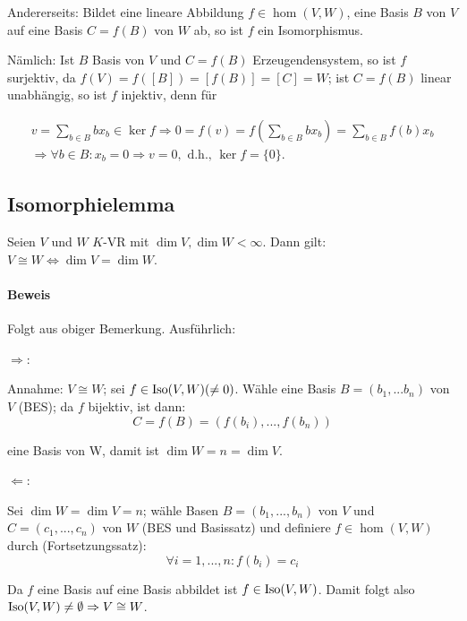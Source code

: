 	Andererseits: Bildet eine lineare Abbildung $f\in \hom(V,W)$, eine Basis $B$ von $V$ auf eine Basis $C = f(B)$ von $W$ ab, so ist $f$ ein Isomorphismus.
	
	Nämlich: Ist $B$ Basis von $V$ und $ C = f(B)$ Erzeugendensystem, so ist $f$ surjektiv, da $f(V) = f ([B]) = [f(B)] = [C] = W$;
	ist $C =f(B)$ linear unabhängig, so ist $f$ injektiv, denn für
			
	\begin{gather*}
		v = \sum_{b\in B} bx_b \in \ker f \Rightarrow 0 = f(v) = f(\sum_{b\in B}bx_b) = \sum_{b\in B}f(b)x_b\\
		\Rightarrow \forall b \in B: x_b = 0 \Rightarrow v = 0, \text{ d.h., } \ker f=\{{0}\}.
	\end{gather*}
			
\subsection{Isomorphielemma}
	\begin{Lemma}[Isomorphielemma]
		Seien $V$ und $W$ $ K $-VR mit $\dim V, \dim W < \infty$.
	Dann gilt: $V \cong W \Leftrightarrow \dim V = \dim W$.
	\end{Lemma}
	
\paragraph{Beweis}
	Folgt aus obiger Bemerkung. Ausführlich:
		
	$\Rightarrow$:
	
	Annahme: $V \cong W$; sei $f\in \operatorname{Iso}(V,W)(\neq 0)$.
	Wähle eine Basis $B = (b_1, ... b_n)$ von $V$ (BES); da $f$ bijektiv, ist dann:
	\begin{equation*}
		C = f(B) = (f(b_i), ... , f(b_n))
	\end{equation*}
	
	eine Basis von W, damit ist $\dim W = n = \dim V$.
	
	$\Leftarrow$:
	
	Sei $\dim W = \dim V = n$;
	wähle Basen $B = (b_1, ... ,b_n)$ von $V$ und $C = (c_1, ... ,c_n)$ von $W$ (BES und Basissatz) und definiere $f\in \hom(V,W)$ durch (Fortsetzungssatz):
	\begin{equation*}
		\forall i = 1, ... ,n : f(b_i) = c_i
	\end{equation*}

	Da $f$ eine Basis auf eine Basis abbildet ist $f\in \operatorname{Iso}(V,W)$.
	Damit folgt also $\operatorname{Iso}(V,W) \neq \emptyset \Rightarrow V \cong W$.
			
